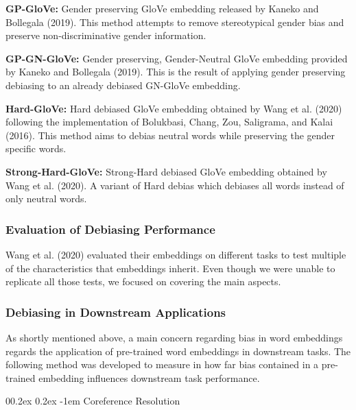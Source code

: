 \documentclass[
  english,
  man,floatsintext]{apa6}
\makeatletter
\let\oldparagraph\paragraph
\renewcommand{\paragraph}[1]{\oldparagraph{#1}\mbox{}}
\renewcommand{\paragraph}{\@startsection{paragraph}{4}{\parindent}%
  {0\baselineskip \@plus 0.2ex \@minus 0.2ex}%
  {-1em}%
  {\normalfont\normalsize\bfseries\itshape\typesectitle}}
\makeatother
\begin{document}
\textbf{GP-GloVe:} Gender preserving GloVe embedding released by Kaneko and Bollegala (2019). This method attempts to remove stereotypical gender bias and preserve non-discriminative gender information.

\textbf{GP-GN-GloVe:} Gender preserving, Gender-Neutral GloVe embedding provided by Kaneko and Bollegala (2019). This is the result of applying gender preserving debiasing to an already debiased GN-GloVe embedding.

\textbf{Hard-GloVe:} Hard debiased GloVe embedding obtained by Wang et al. (2020) following the implementation of Bolukbasi, Chang, Zou, Saligrama, and Kalai (2016). This method aims to debias neutral words while preserving the gender specific words.

\textbf{Strong-Hard-GloVe:} Strong-Hard debiased GloVe embedding obtained by Wang et al. (2020). A variant of Hard debias which debiases all words instead of only neutral words.

\hypertarget{evaluation-of-debiasing-performance}{%
\subsubsection{Evaluation of Debiasing Performance}\label{evaluation-of-debiasing-performance}}

Wang et al. (2020) evaluated their embeddings on different tasks to test multiple of the characteristics that embeddings inherit. Even though we were unable to replicate all those tests, we focused on covering the main aspects.

\hypertarget{debiasing-in-downstream-applications}{%
\subsubsection{Debiasing in Downstream Applications}\label{debiasing-in-downstream-applications}}

As shortly mentioned above, a main concern regarding bias in word embeddings regards the application of pre-trained word embeddings in downstream tasks. The following method was developed to measure in how far bias contained in a pre-trained embedding influences downstream task performance.

\hypertarget{coreference-resolution}{%
\paragraph{Coreference Resolution}\label{coreference-resolution}}
\end{document}
